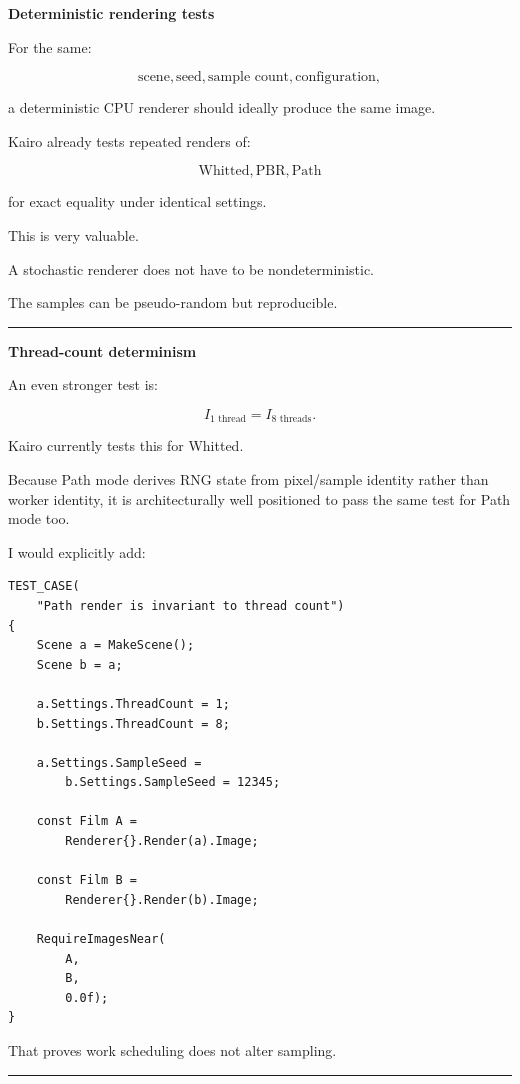 \textbf{Deterministic rendering tests}

For the same:

\[
\text{scene},
\text{seed},
\text{sample count},
\text{configuration},
\]

a deterministic CPU renderer should ideally produce the same image.

Kairo already tests repeated renders of:

\[
\text{Whitted},
\text{PBR},
\text{Path}
\]

for exact equality under identical settings.

This is very valuable.

A stochastic renderer does not have to be nondeterministic.

The samples can be pseudo-random but reproducible.

\begin{center}\rule{0.5\linewidth}{0.5pt}\end{center}

\textbf{Thread-count determinism}

An even stronger test is:

\[
I_{\text{1 thread}}
=
I_{\text{8 threads}}.
\]

Kairo currently tests this for Whitted.

Because Path mode derives RNG state from pixel/sample identity rather than worker identity, it is architecturally well positioned to pass the same test for Path mode too.

I would explicitly add:

\begin{verbatim}
TEST_CASE(
    "Path render is invariant to thread count")
{
    Scene a = MakeScene();
    Scene b = a;

    a.Settings.ThreadCount = 1;
    b.Settings.ThreadCount = 8;

    a.Settings.SampleSeed =
        b.Settings.SampleSeed = 12345;

    const Film A =
        Renderer{}.Render(a).Image;

    const Film B =
        Renderer{}.Render(b).Image;

    RequireImagesNear(
        A,
        B,
        0.0f);
}
\end{verbatim}

That proves work scheduling does not alter sampling.

\begin{center}\rule{0.5\linewidth}{0.5pt}\end{center}


